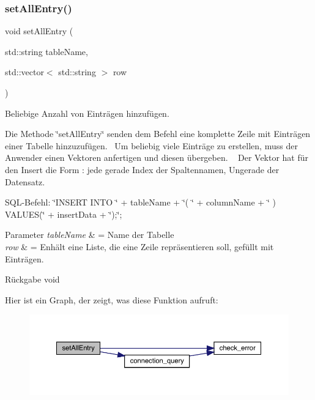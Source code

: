 \subsubsection{set\+All\+Entry()}
{\footnotesize\ttfamily void set\+All\+Entry (\begin{DoxyParamCaption}\item[{std\+::string}]{table\+Name,  }\item[{std\+::vector$<$ std\+::string $>$}]{row }\end{DoxyParamCaption})}



Beliebige Anzahl von Einträgen hinzufügen. 

Die Methode \char`\"{}set\+All\+Entry\char`\"{} senden dem Befehl eine komplette Zeile mit Einträgen einer Tabelle hinzuzufügen.~\newline
 Um beliebig viele Einträge zu erstellen, muss der Anwender einen Vektoren anfertigen und diesen übergeben. ~\newline
 Der Vektor hat für den Insert die Form \+: jede gerade Index der Spaltennamen, Ungerade der Datensatz.~\newline


S\+Q\+L-\/\+Befehl\+: \char`\"{}\+I\+N\+S\+E\+R\+T I\+N\+T\+O \char`\"{} + table\+Name + \char`\"{}( \char`\"{} + column\+Name + \char`\"{} ) V\+A\+L\+U\+E\+S(\char`\"{} + insert\+Data + \char`\"{});\char`\"{};


\begin{DoxyParams}{Parameter}
{\em table\+Name} & = Name der Tabelle \\
\hline
{\em row} & = Enhält eine Liste, die eine Zeile repräsentieren soll, gefüllt mit Einträgen.\\
\hline
\end{DoxyParams}
\begin{DoxyReturn}{Rückgabe}
void 
\end{DoxyReturn}
Hier ist ein Graph, der zeigt, was diese Funktion aufruft\+:\nopagebreak
\begin{figure}[H]
\begin{center}
\leavevmode
\includegraphics[width=350pt]{entry_8cpp_aeb45ccd70b8692b592754a0886c2d109_cgraph}
\end{center}
\end{figure}
\mbox{\label{entry_8cpp_a1faab165d9a7dc43808e1a0075e007f9}} 
